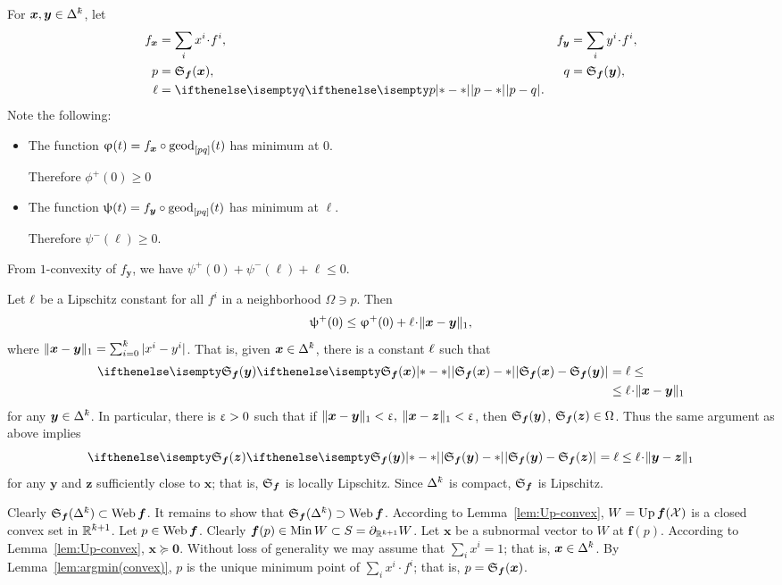 For $\bm{x},\bm{y}\in\Delta^\kay$,
let 
\begin{align*}
f_{\bm{x}}
&=\sum_i x^i\cdot f^i,
&
f_{\bm{y}}
&=\sum_i y^i\cdot f^i,
\\
p
&=\spx{\bm{f}}(\bm{x}),
&
q
&=\spx{\bm{f}}(\bm{y}),
\\
\ell&=\dist{p}{q}{}.
\end{align*}
Note the following:
\begin{itemize}
\item The function $\phi(t)=f_{\bm{x}}\circ\geod_{[p q]}(t)$ has minimum at $0$. 

Therefore $\phi^+(0)\ge 0$
\item The function $\psi(t)=f_{\bm{y}}\circ\geod_{[p q]}(t)$ has minimum at $\ell$. 

Therefore $\psi^-(\ell)\ge 0$.
\end{itemize}
From $1$-convexity of $f_{\bm{y}}$, we have
$\psi^+(0)+\psi^-(\ell)+\ell\le0$.

Let ${\ell}$ be a Lipschitz constant for all $f^i$ in a neighborhood $\Omega\ni p$.
Then 
\[\psi^+(0)
\le 
\phi^+(0)+\Lip\cdot\|\bm{x}-\bm{y}\|_1,\] 
where $\|\bm{x}-\bm{y}\|_1=\sum_{i=0}^\kay|x^i-y^i|$.
That is, given $\bm{x}\in\Delta^\kay$, there is a constant ${\ell}$ such that
\begin{align*}
\dist{\spx{\bm{f}}(\bm{x})}{\spx{\bm{f}}(\bm{y})}{}
&=
\ell
\le
\\
&\le 
\Lip\cdot\|\bm{x}-\bm{y}\|_1
\end{align*}
for any $\bm{y}\in\Delta^\kay$.
In particular, there is $\upvarepsilon>0$ such that if $\|\bm{x}-\bm{y}\|_1<\upvarepsilon,$ $\|\bm{x}-\bm{z}\|_1 <\upvarepsilon$, then $\mathfrak{S}_{\bm{f}}(\bm{y})$, $\spx{\bm{f}}(\bm{z})\in\Omega$. 
Thus the same argument as above implies 
\[\dist{\spx{\bm{f}}(\bm{y})}{\spx{\bm{f}}(\bm{z})}{}
=
\ell\le \Lip\cdot\|\bm{y}-\bm{z}\|_1\]
for any $\bm{y}$ and $\bm{z}$ sufficiently close to $\bm{x}$; that is, $\mathfrak{S}_{\bm{f}}$ is locally Lipschitz.
Since $\Delta^\kay$ is compact, $\mathfrak{S}_{\bm{f}}$ is Lipschitz.

Clearly $\spx{\bm{f}}(\Delta^\kay)\subset \Web \bm{f}$.
It remains to show that $\spx{\bm{f}}(\Delta^\kay)\supset \Web \bm{f}$.
According to Lemma~\ref{lem:Up-convex},
$W=\mathop{\rm Up}\nolimits\bm{f}(\mathcal{X})$ is a closed convex set in $\RR^{\kay+1}$.
Let $p\in \Web \bm{f}$. 
Clearly $\bm{f}(p)\in \Min W\subset S\z=\Fr_{\RR^{\kay+1}}W$.
Let $\bm{x}$ be a subnormal vector to $W$ at $\bm{f}(p)$.
According to Lemma~\ref{lem:Up-convex}, 
$\bm{x} \succcurlyeq\bm{0}$.
Without loss of generality we may assume that $\sum_i x^i=1$;
that is, $\bm{x}\in \Delta^\kay$.
By Lemma~\ref{lem:argmin(convex)},
$p$ is the unique minimum point of $\sum_i x^i\cdot f^i$;
that is, $p=\mathfrak{S}_{\bm{f}}(\bm{x})$.
\qeds








